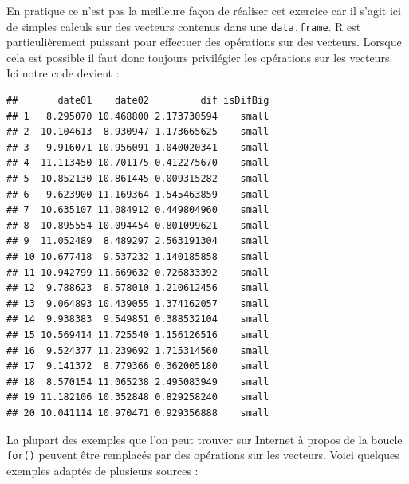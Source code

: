 \documentclass[
]{book}
\newenvironment{Shaded}{\begin{snugshade}}{\end{snugshade}}
\newcommand{\DataTypeTok}[1]{\textcolor[rgb]{0.13,0.29,0.53}{#1}}
\newcommand{\DecValTok}[1]{\textcolor[rgb]{0.00,0.00,0.81}{#1}}
\newcommand{\KeywordTok}[1]{\textcolor[rgb]{0.13,0.29,0.53}{\textbf{#1}}}
\newcommand{\NormalTok}[1]{#1}
\newcommand{\OperatorTok}[1]{\textcolor[rgb]{0.81,0.36,0.00}{\textbf{#1}}}
\newcommand{\StringTok}[1]{\textcolor[rgb]{0.31,0.60,0.02}{#1}}
\begin{document}
En pratique ce n'est pas la meilleure façon de réaliser cet exercice car il s'agit ici de simples calculs sur des vecteurs contenus dans une \texttt{data.frame}. R est particulièrement puissant pour effectuer des opérations sur des vecteurs. Lorsque cela est possible il faut donc toujours privilégier les opérations sur les vecteurs. Ici notre code devient :

\begin{Shaded}
\end{Shaded}

\begin{verbatim}
##       date01    date02         dif isDifBig
## 1   8.295070 10.468800 2.173730594    small
## 2  10.104613  8.930947 1.173665625    small
## 3   9.916071 10.956091 1.040020341    small
## 4  11.113450 10.701175 0.412275670    small
## 5  10.852130 10.861445 0.009315282    small
## 6   9.623900 11.169364 1.545463859    small
## 7  10.635107 11.084912 0.449804960    small
## 8  10.895554 10.094454 0.801099621    small
## 9  11.052489  8.489297 2.563191304    small
## 10 10.677418  9.537232 1.140185858    small
## 11 10.942799 11.669632 0.726833392    small
## 12  9.788623  8.578010 1.210612456    small
## 13  9.064893 10.439055 1.374162057    small
## 14  9.938383  9.549851 0.388532104    small
## 15 10.569414 11.725540 1.156126516    small
## 16  9.524377 11.239692 1.715314560    small
## 17  9.141372  8.779366 0.362005180    small
## 18  8.570154 11.065238 2.495083949    small
## 19 11.182106 10.352848 0.829258240    small
## 20 10.041114 10.970471 0.929356888    small
\end{verbatim}

La plupart des exemples que l'on peut trouver sur Internet à propos de la boucle \texttt{for()} peuvent être remplacés par des opérations sur les vecteurs. Voici quelques exemples adaptés de plusieurs sources :
\end{document}
